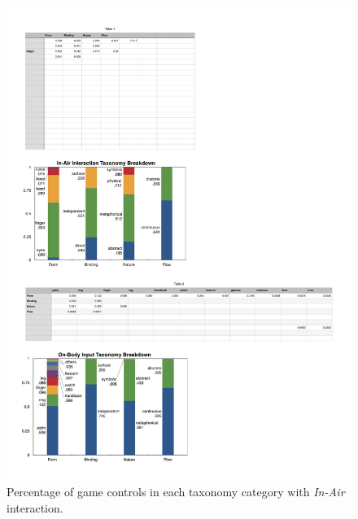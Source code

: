 \documentclass{sigchi}
\begin{document}
 \begin{figure}[!h]
  \centering
  \includegraphics[width=1\columnwidth]{InAirTaxonomy.pdf}
  \caption{Percentage of game controls in each taxonomy category with \emph{In-Air} interaction.}
  \label{fig:InAirTaxonomy}
  \end{figure} 
\end{document}
